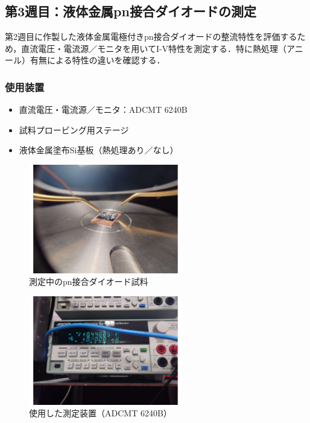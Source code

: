 \subsection{第3週目：液体金属pn接合ダイオードの測定}

第2週目に作製した液体金属電極付きpn接合ダイオードの整流特性を評価するため，直流電圧・電流源／モニタを用いてI-V特性を測定する．特に熱処理（アニール）有無による特性の違いを確認する．

\subsubsection*{使用装置}

\begin{itemize}
    \item 直流電圧・電流源／モニタ：ADCMT 6240B
    \item 試料プロービング用ステージ
    \item 液体金属塗布Si基板（熱処理あり／なし）
\end{itemize}

\begin{figure}[H]
    \centering
    \includegraphics[width=0.6\textwidth]{figure/20250728_133409.pdf}
    \caption{測定中のpn接合ダイオード試料}
    \label{fig:probe_sample}
\end{figure}

\begin{figure}[H]
    \centering
    \includegraphics[width=0.6\textwidth]{figure/20250728_131929.pdf}
    \caption{使用した測定装置（ADCMT 6240B）}
    \label{fig:adcmt}
\end{figure}

